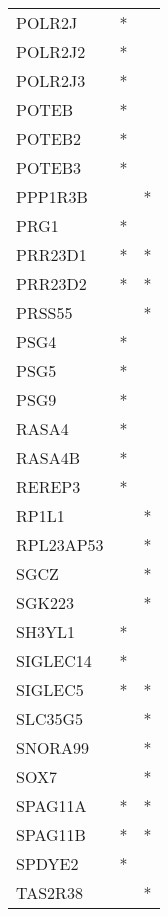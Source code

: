 \begin{longtable}{lcc}
POLR2J       &              * &            \\
POLR2J2      &              * &            \\
POLR2J3      &              * &            \\
POTEB        &              * &            \\
POTEB2       &              * &            \\
POTEB3       &              * &            \\
PPP1R3B      &                &          * \\
PRG1         &              * &            \\
PRR23D1      &              * &          * \\
PRR23D2      &              * &          * \\
PRSS55       &                &          * \\
PSG4         &              * &            \\
PSG5         &              * &            \\
PSG9         &              * &            \\
RASA4        &              * &            \\
RASA4B       &              * &            \\
REREP3       &              * &            \\
RP1L1        &                &          * \\
RPL23AP53    &                &          * \\
SGCZ         &                &          * \\
SGK223       &                &          * \\
SH3YL1       &              * &            \\
SIGLEC14     &              * &            \\
SIGLEC5      &              * &          * \\
SLC35G5      &                &          * \\
SNORA99      &                &          * \\
SOX7         &                &          * \\
SPAG11A      &              * &          * \\
SPAG11B      &              * &          * \\
SPDYE2       &              * &            \\
TAS2R38      &                &          * \\

\end{longtable}
